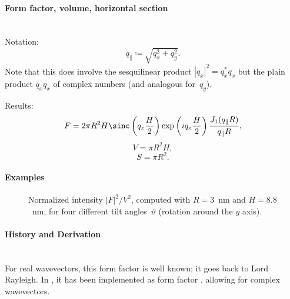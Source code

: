 \paragraph{Form factor, volume, horizontal section}\strut\\
Notation:
\begin{equation*}
  q_{\parallel} \coloneqq \sqrt{q_x^2+q_y^2}.
\end{equation*}
Note that this does  involve the sesquilinear product
$|q_x|^2=q_x^* q_x$ but the plain product $q_xq_x$ of complex numbers
(and analogous for~$q_y$).

Results:
\begin{equation*}
  F=  2\pi R^2 H  \sinc\left(q_ z \frac{H}{2}\right) \exp\left(i q_ z \frac{H}{2}\right)
    \frac{J_1(q_{\parallel} R )}{q_{\parallel} R },
\end{equation*}
\begin{equation*}
  V = \pi R^2 H,
\end{equation*}
\begin{equation*}
  S=\pi R^2.
\end{equation*}

\paragraph{Examples}\strut

\begin{figure}[H]
\begin{center}
\end{center}
\caption{Normalized intensity $|F|^2/V^2$,
computed with $R=3$~nm and $H=8.8$~nm,
for four different tilt angles~$\vartheta$ (rotation around the $y$ axis).}
\end{figure}

\paragraph{History and Derivation}\strut\\
For real wavevectors, this form factor is well known;
it goes back to Lord Rayleigh.
In \IsGISAXS, it has been implemented as form factor 
\cite[Eq.~2.27]{Laz06} \cite[Eq.~223]{ReLL09},
allowing for complex wavevectors.

